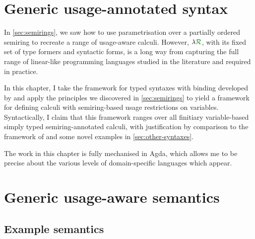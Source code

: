 \chapter{Generic usage-annotated syntax}\label{sec:framework}

In \cref{sec:semirings}, we saw how to use parametrisation over a partially
ordered semiring to recreate a range of usage-aware calculi.
However, $\name$, with its fixed set of type formers and syntactic forms, is a
long way from capturing the full range of linear-like programming languages
studied in the literature and required in practice.

In this chapter, I take the framework for typed syntaxes with binding developed
by \citet{AACMM21} and apply the principles we discovered in
\cref{sec:semirings} to yield a framework for defining calculi with
semiring-based usage restrictions on variables.
Syntactically, I claim that this framework ranges over all finitiary
variable-based simply typed semiring-annotated calculi, with justification by
comparison to the framework of \citet{AACMM21} and some novel examples in
\cref{sec:other-syntaxes}.

The work in this chapter is fully mechanised in Agda, which allows me to be
precise about the various levels of domain-specific languages which appear.



\chapter{Generic usage-aware semantics}\label{sec:semantics}



\section{Example semantics}\label{sec:example-semantics}


